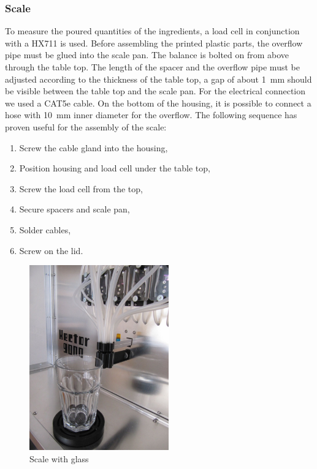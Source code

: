 \documentclass[a4paper]{scrartcl}
\begin{document}
\subsubsection{Scale}
To measure the poured quantities of the ingredients, a load cell in conjunction with a HX711 is used. Before assembling the printed plastic parts, the overflow pipe must be glued into the scale pan. The balance is bolted on from above through the table top. The length of the spacer and the overflow pipe must be adjusted according to the thickness of the table top, a gap of about \SI{1}{\milli\metre} should be visible between the table top and the scale pan. For the electrical connection we used a CAT5e cable. On the bottom of the housing, it is possible to connect a hose with \SI{10}{\milli\metre} inner diameter for the overflow. The following sequence has proven useful for the assembly of the scale:

\begin{enumerate}
  \item Screw the cable gland into the housing,
  \item Position housing and load cell under the table top,
  \item Screw the load cell from the top,
  \item Secure spacers and scale pan,
  \item Solder cables,
  \item Screw on the lid.
\end{enumerate}

\begin{figure}
  \centering
  \includegraphics[height=8cm]{pics/scale_glass.JPG}
  \caption{Scale with glass} \label{scale_glass}
\end{figure}
\end{document}
